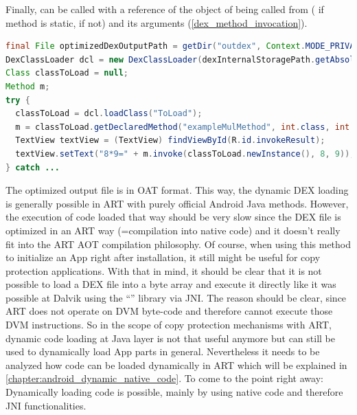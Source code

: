 Finally,  can be called with a reference of the object of being called from ( if method is static,  if not) and its arguments (\autoref{dex_method_invocation}).
\begin{lstlisting}[language=Java, caption=Dex Method Invocation, label=dex_method_invocation]
final File optimizedDexOutputPath = getDir("outdex", Context.MODE_PRIVATE);
DexClassLoader dcl = new DexClassLoader(dexInternalStoragePath.getAbsolutePath(), optimizedDexOutputPath.getAbsolutePath(), null, getClassLoader());
Class classToLoad = null;
Method m;
try {
  classToLoad = dcl.loadClass("ToLoad");
  m = classToLoad.getDeclaredMethod("exampleMulMethod", int.class, int.class);
  TextView textView = (TextView) findViewById(R.id.invokeResult);
  textView.setText("8*9=" + m.invoke(classToLoad.newInstance(), 8, 9));
} catch ...
\end{lstlisting}
The optimized output file is in OAT format.
This way, the dynamic DEX loading is generally possible in ART with purely official
Android Java methods. However, the execution of code loaded that way should
be very slow since the DEX file is optimized in an ART way (=compilation
into native code) and it doesn't really fit into the ART AOT compilation
philosophy. Of course, when using this method to initialize an App right after installation, it still might be useful for copy protection applications.
With that in mind, it should be clear that it is not possible
to load a DEX file into a byte array and execute it directly like it was
possible at Dalvik using the ``'' library via JNI.
The reason should be clear, since ART does not operate on DVM byte-code and therefore cannot execute those DVM instructions.
So in the scope of copy protection mechanisms
with ART, dynamic code loading at Java layer is not that useful anymore
but can still be used to dynamically load App parts in general.
Nevertheless it needs to be analyzed how code can be loaded dynamically in ART which will be explained in \autoref{chapter:android_dynamic_native_code}.
To come to the point right away: Dynamically loading code is possible, mainly
by using native code and therefore JNI functionalities.


